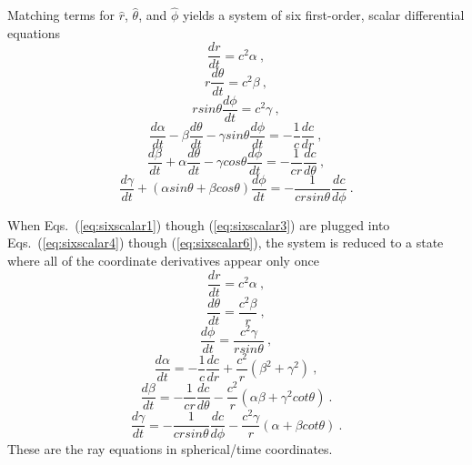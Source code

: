 \documentclass{ws-jca}
\begin{document}
Matching terms for \(\hat{r}\), \(\hat{\theta}\), and \(\hat{\phi}\) yields
a system of six first-order, scalar differential equations
\begin{equation}
\frac{dr}{dt} = c^2 \alpha \:,
\label{eq:sixscalar1}
\end{equation}
\begin{equation}
	r \frac{d\theta}{dt} = c^2 \beta \:,
	\label{eq:sixscalar2}
\end{equation}
\begin{equation}
	r sin\theta \frac{d\phi}{dt} = c^2\gamma \:,
	\label{eq:sixscalar3}
\end{equation}
\begin{equation}
	\frac{d\alpha}{dt} - \beta \frac{d\theta}{dt} 
		- \gamma sin\theta \frac{d\phi}{dt} 
		= -\frac{1}{c}\frac{dc}{dr} \:,
	\label{eq:sixscalar4}
\end{equation}
\begin{equation}
	\frac{d\beta}{dt} + \alpha \frac{d\theta}{dt} 
		- \gamma cos\theta \frac{d\phi}{dt} 
		= -\frac{1}{cr}\frac{dc}{d\theta} \:,
	\label{eq:sixscalar5}
\end{equation}
\begin{equation}
	\frac{d\gamma}{dt} + \left( \alpha sin\theta 
		+ \beta cos\theta \right) \frac{d\phi}{dt} 
		= -\frac{1}{cr sin\theta}\frac{dc}{d\phi} \:.
	\label{eq:sixscalar6}
\end{equation}

When Eqs.~(\ref{eq:sixscalar1}) though (\ref{eq:sixscalar3}) are plugged
into Eqs.~(\ref{eq:sixscalar4}) though (\ref{eq:sixscalar6}), the system is
reduced to a state where all of the coordinate derivatives appear only once
\begin{equation}
	\frac{dr}{dt} = c^2 \alpha \:,
\end{equation}
\begin{equation}
	\frac{d\theta}{dt} = \frac{c^2 \beta}{r} \:,
\end{equation}
\begin{equation}
	\frac{d\phi}{dt} = \frac{c^2\gamma}{r sin\theta} \:,
\end{equation}
\begin{equation}
	\frac{d\alpha}{dt} = -\frac{1}{c}\frac{dc}{dr} 
		+ \frac{c^2}{r}\left( \beta^2 + \gamma^2 \right) \:,
\end{equation}
\begin{equation}
	\frac{d\beta}{dt} = -\frac{1}{cr}\frac{dc}{d\theta} 
		- \frac{c^2}{r} \left( \alpha \beta + \gamma^2 cot\theta \right) \:.
\end{equation}
\begin{equation}
	\frac{d\gamma}{dt} = -\frac{1}{cr sin\theta}\frac{dc}{d\phi} 
		- \frac{c^2 \gamma}{r} \left( \alpha + \beta cot\theta \right) \:.
\end{equation}
These are the ray equations in spherical/time coordinates.
\end{document}
